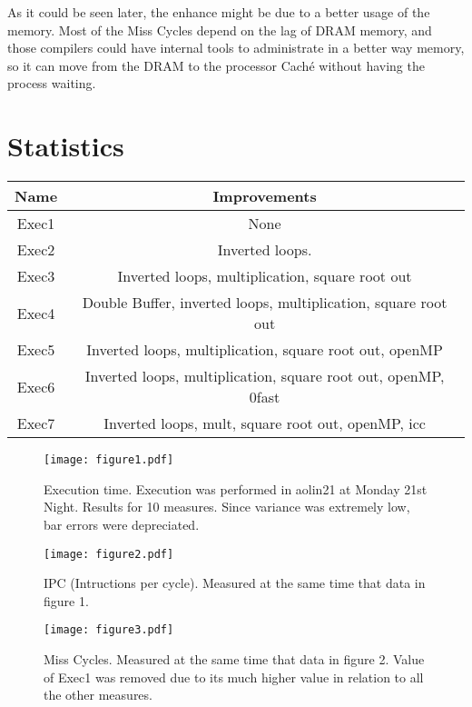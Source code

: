 \documentclass{article}
\begin{document}
	As it could be seen later, the enhance might be due to
	a better usage of the memory. Most of the Miss Cycles depend
	on the lag of DRAM memory, and those compilers could
	have internal tools to administrate in a better way memory,
	so it can move from the DRAM to the processor Caché without
	having the process waiting.

\section{Statistics}

	\begin{center}
	\begin{tabular}{||c|c||}
		\hline
		Name & Improvements \\
		\hline
		Exec1 & None \\
		Exec2 & Inverted loops. \\
		Exec3 & Inverted loops, multiplication, square root out \\
		Exec4 & Double Buffer, inverted loops, multiplication, square root out \\
		Exec5 & Inverted loops, multiplication, square root out, openMP \\
		Exec6 & Inverted loops, multiplication, square root out, openMP, 0fast \\
		Exec7 & Inverted loops, mult, square root out, openMP, icc \\
		\hline
	\end{tabular}
	\end{center}


	\begin{figure}
		\centering
		\texttt{[image: figure1.pdf]}
		\caption {Execution time. Execution was performed in aolin21 at Monday 21st
		Night. Results for 10 measures. Since variance was extremely
		low, bar errors were depreciated.}
		\label{fig:Plot1}
	\end{figure}

	\begin{figure}
		\centering
		\texttt{[image: figure2.pdf]}
		\caption {IPC (Intructions per cycle). Measured at the
		same time that data in figure 1.}
		\label{fig:Plot2}
	\end{figure}

	\begin{figure}
		\centering
		\texttt{[image: figure3.pdf]}
		\caption {Miss Cycles. Measured at the same time that data
		in figure 2. Value of Exec1 was removed due to its much
		higher value in relation to all the other measures.}
		\label{fig:Plot3}
	\end{figure}
	
\end{document}
